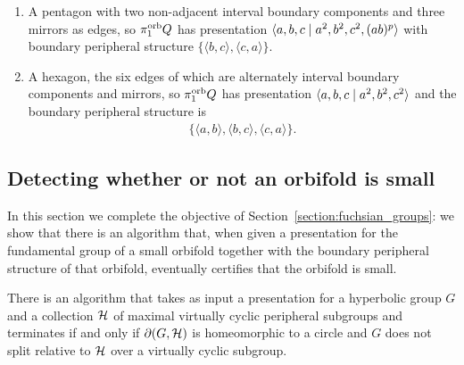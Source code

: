 \begin{proposition}
\begin{enumerate}
 \item A pentagon with two non-adjacent interval boundary components and three mirrors as edges, so $\pi_1^{\mathrm{orb}} Q$ has presentation $\langle a, b, c \mid a^2, b^2, c^2, (ab)^p\rangle$ with boundary peripheral structure $\{\langle b, c\rangle, \langle c, a\rangle\}$.
 \item A hexagon, the six edges of which are alternately interval boundary components and mirrors, so $\pi_1^{\mathrm{orb}} Q$ has presentation $\langle a, b, c \mid a^2, b^2, c^2\rangle$ and the boundary peripheral structure is  
   \begin{align*}
     \{\langle a, b\rangle, \langle b, c\rangle, \langle c, a\rangle\}.
   \end{align*}
\end{enumerate}
\end{proposition}

\subsection{Detecting whether or not an orbifold is small}

In this section we complete the objective of Section~\ref{section:fuchsian_groups}: we show that there is an algorithm that, when given a presentation for the fundamental group of a small orbifold together with the boundary peripheral structure of that orbifold, eventually certifies that the orbifold is small.

\begin{lemma}\label{lemma:identifying_small_orbifolds} 
  There is an algorithm that takes as input a presentation for a hyperbolic group $G$ and a collection $\mathcal{H}$ of maximal virtually cyclic peripheral subgroups and terminates if and only if $\partial(G, \mathcal{H})$ is homeomorphic to a circle and $G$ does not split relative to $\mathcal{H}$ over a virtually cyclic subgroup.
\end{lemma}

